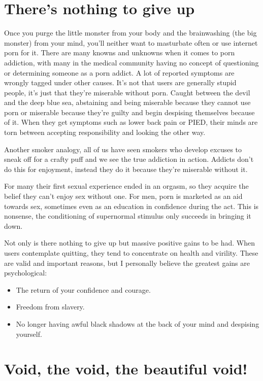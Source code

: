 \documentclass[
]{book}
\begin{document}
\hypertarget{theres-nothing-to-give-up}{%
\section{There's nothing to give up}\label{theres-nothing-to-give-up}}

Once you purge the little monster from your body and the brainwashing (the big monster) from your mind, you'll neither want to masturbate often or use internet porn for it. There are many knowns and unknowns when it comes to porn addiction, with many in the medical community having no concept of questioning or determining someone as a porn addict. A lot of reported symptoms are wrongly tagged under other causes. It's not that users are generally stupid people, it's just that they're miserable without porn. Caught between the devil and the deep blue sea, abstaining and being miserable because they cannot use porn or miserable because they're guilty and begin despising themselves because of it. When they get symptoms such as lower back pain or PIED, their minds are torn between accepting responsibility and looking the other way.

Another smoker analogy, all of us have seen smokers who develop excuses to sneak off for a crafty puff and we see the true addiction in action. Addicts don't do this for enjoyment, instead they do it because they're miserable without it.

For many their first sexual experience ended in an orgasm, so they acquire the belief they can't enjoy sex without one. For men, porn is marketed as an aid towards sex, sometimes even as an education in confidence during the act. This is nonsense, the conditioning of supernormal stimulus only succeeds in bringing it down.

Not only is there nothing to give up but massive positive gains to be had. When users contemplate quitting, they tend to concentrate on health and virility. These are valid and important reasons, but I personally believe the greatest gains are psychological:

\begin{itemize}
\item
  The return of your confidence and courage.
\item
  Freedom from slavery.
\item
  No longer having awful black shadows at the back of your mind and despising yourself.
\end{itemize}

\hypertarget{void-the-void-the-beautiful-void}{%
\section{Void, the void, the beautiful void!}\label{void-the-void-the-beautiful-void}}
\end{document}
